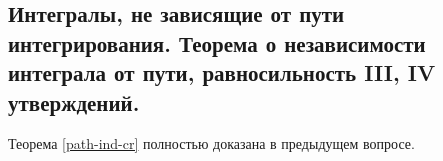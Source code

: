 \subsection{%
  Интегралы, не зависящие от пути интегрирования. Теорема о независимости
  интеграла от пути, равносильность III, IV утверждений.%
}

\begin{remark}
  Теорема \ref{path-ind-cr} полностью доказана в предыдущем вопросе.
\end{remark}
